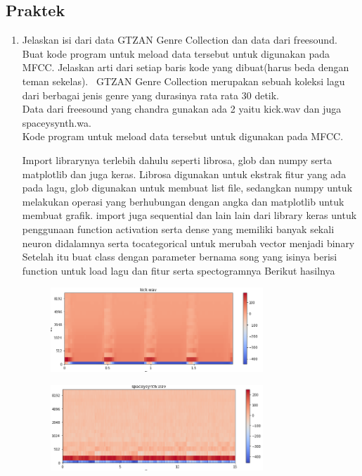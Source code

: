 \subsection{Praktek}
\begin{enumerate}
	\item Jelaskan isi dari data GTZAN Genre Collection dan data dari freesound. Buat kode program untuk meload data tersebut untuk digunakan pada MFCC. Jelaskan arti dari setiap baris kode yang dibuat(harus beda dengan teman sekelas).
	\hfill\break
	\ GTZAN Genre Collection merupakan sebuah koleksi lagu dari berbagai jenis genre yang durasinya rata rata 30 detik.\\
	Data dari freesound yang chandra gunakan ada 2 yaitu kick.wav dan juga spaceysynth.wa.\\
	Kode program untuk meload data tersebut untuk digunakan pada MFCC.
	
	\hfill\break
	Import librarynya terlebih dahulu seperti librosa, glob dan numpy serta matplotlib dan juga keras. Librosa digunakan untuk ekstrak fitur yang ada pada lagu, glob digunakan untuk membuat list file, sedangkan numpy untuk melakukan operasi yang berhubungan dengan angka dan matplotlib untuk membuat grafik. import juga sequential dan lain lain dari library keras untuk penggunaan function activation serta dense yang memiliki banyak sekali neuron didalamnya serta tocategorical untuk merubah vector menjadi binary
	\hfill\break
	Setelah itu buat class dengan parameter bernama song yang isinya berisi function untuk load lagu dan fitur serta spectogramnya
	\hfill\break
	Berikut hasilnya
	\hfill\break
	\begin{figure}[H]
		\includegraphics[width=8cm]{figures/1174079/6/1-1.PNG}
		\centering
	\end{figure}
	\hfill\break
	\begin{figure}[H]
		\includegraphics[width=8cm]{figures/1174079/6/1-2.PNG}

\end{figure}
\end{enumerate}
